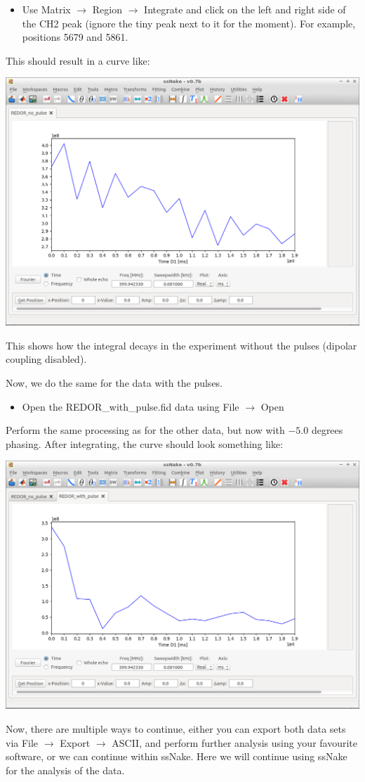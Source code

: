 \documentclass[11pt,a4paper]{article}
\begin{document}
\begin{itemize}
\item Use Matrix $\longrightarrow$ Region $\longrightarrow$ Integrate and click on the left and right side of the CH2 peak (ignore the tiny peak next to it for the moment). For example, positions 5679 and 5861.
\end{itemize}
This should result in a curve like:
\begin{center}
\includegraphics[width=0.8\linewidth]{Figs/Fig2.png}
\end{center}
This shows how the integral decays in the experiment without the pulses (dipolar coupling disabled).

Now, we do the same for the data with the pulses. 
\begin{itemize}
\item Open the REDOR\_with\_pulse.fid data using File $\longrightarrow$ Open
\end{itemize}
Perform the same processing as for the other data, but now with $-5.0$ degrees phasing.
After integrating, the curve should look something like:
\begin{center}
\includegraphics[width=0.8\linewidth]{Figs/Fig3.png}
\end{center}
Now, there are multiple ways to continue, either you can export both data sets via File $\longrightarrow$ Export  $\longrightarrow$ ASCII, and perform further analysis using your favourite software, or we can continue within ssNake.
Here we will continue using ssNake for the analysis of the data.
\end{document}
